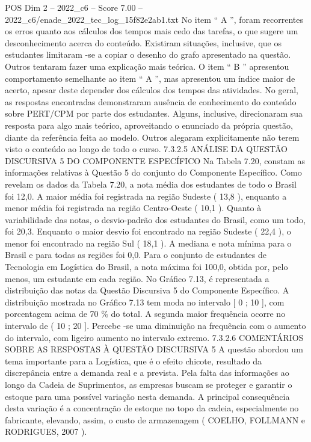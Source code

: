 \begin{textsample}{POS Dim 2 – 2022\_c6 – Score 7.00 – 2022\_c6/enade\_2022\_tec\_log\_15f82e2ab1.txt}
No item “ A ”, foram recorrentes os erros quanto aos cálculos dos tempos mais cedo das tarefas, o que sugere um desconhecimento acerca do conteúdo.
Existiram situações, inclusive, que os estudantes limitaram -se a copiar o desenho do grafo apresentado na questão.
Outros tentaram fazer uma explicação mais teórica.
O item “ B ” apresentou comportamento semelhante ao item “ A ”, mas apresentou um índice maior de acerto, apesar deste depender dos cálculos dos tempos das atividades.
No geral, as respostas encontradas demonstraram ausência de conhecimento do conteúdo sobre PERT/CPM por parte dos estudantes.
Alguns, inclusive, direcionaram sua resposta para algo mais teórico, aproveitando o enunciado da própria questão, diante da referência feita ao modelo.
Outros alegaram explicitamente não terem visto o conteúdo ao longo de todo o curso. 7.3.2.5 ANÁLISE DA QUESTÃO DISCURSIVA 5 DO COMPONENTE ESPECÍFICO Na Tabela 7.20, constam as informações relativas à Questão 5 do conjunto do Componente Específico.
Como revelam os dados da Tabela 7.20, a nota média dos estudantes de todo o Brasil foi 12,0.
A maior média foi registrada na região Sudeste ( 13,8 ), enquanto a menor média foi registrada na região Centro-Oeste ( 10,1 ).
Quanto à variabilidade das notas, o desvio-padrão dos estudantes do Brasil, como um todo, foi 20,3.
Enquanto o maior desvio foi encontrado na região Sudeste ( 22,4 ), o menor foi encontrado na região Sul ( 18,1 ).
A mediana e nota mínima para o Brasil e para todas as regiões foi 0,0.
Para o conjunto de estudantes de Tecnologia em Logística do Brasil, a nota máxima foi 100,0, obtida por, pelo menos, um estudante em cada região.
No Gráfico 7.13, é representada a distribuição das notas da Questão Discursiva 5 do Componente Específico.
A distribuição mostrada no Gráfico 7.13 tem moda no intervalo [ 0 ; 10 ], com porcentagem acima de 70 \% do total.
A segunda maior frequência ocorre no intervalo de ( 10 ; 20 ].
Percebe -se uma diminuição na frequência com o aumento do intervalo, com ligeiro aumento no intervalo extremo. 7.3.2.6 COMENTÁRIOS SOBRE AS RESPOSTAS À QUESTÃO DISCURSIVA 5 A questão abordou um tema importante para a Logística, que é o efeito chicote, resultado da discrepância entre a demanda real e a prevista.
Pela falta das informações ao longo da Cadeia de Suprimentos, as empresas buscam se proteger e garantir o estoque para uma possível variação nesta demanda.
A principal consequência desta variação é a concentração de estoque no topo da cadeia, especialmente no fabricante, elevando, assim, o custo de armazenagem ( COELHO, FOLLMANN e RODRIGUES, 2007 ).

\end{textsample}
